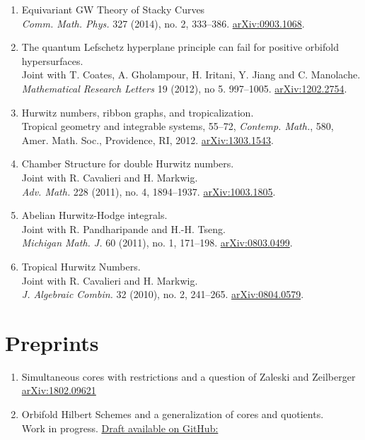 \documentclass[11pt,letterpaper]{article}
\begin{document}
\begin{enumerate}
\item Equivariant GW Theory of Stacky Curves \\  \emph{Comm. Math. Phys.} 327 (2014), no. 2, 333--386. \href{http://arxiv.org/abs/0903.1068}{arXiv:0903.1068}.
\item The quantum Lefschetz hyperplane principle can fail for positive orbifold hypersurfaces. \\
 Joint with T. Coates, A. Gholampour, H. Iritani, Y. Jiang and C. Manolache. \\
   \emph{Mathematical Research Letters} 19 (2012), no 5. 997--1005.
\href{http://arxiv.org/abs/1202.2754}{arXiv:1202.2754}.
\item Hurwitz numbers, ribbon graphs, and tropicalization. \\ Tropical
  geometry and integrable systems, 55--72, \emph{Contemp. Math.}, 580,
  Amer. Math. Soc., Providence, RI, 2012.
\href{http://arxiv.org/abs/1303.1543}{arXiv:1303.1543}.
\item Chamber Structure for double Hurwitz numbers.
\\ Joint with R. Cavalieri and H. Markwig. \\ \emph{Adv. Math.} 228 (2011), no. 4,
  1894--1937.
\href{http://arxiv.org/abs/1003.1805}{arXiv:1003.1805}.
 \item Abelian Hurwitz-Hodge integrals. \\ 
Joint with R. Pandharipande and H.-H. Tseng.  \\  
\emph{Michigan Math. J.} 60 (2011), no. 1, 171--198.
\href{http://arxiv.org/abs/0803.0499}{arXiv:0803.0499}.
\item Tropical Hurwitz Numbers. \\
 Joint with R. Cavalieri and H. Markwig. \\
\emph{J. Algebraic Combin.} 32 (2010), no. 2, 241--265. 
\href{http://arxiv.org/abs/0804.0579}{arXiv:0804.0579}.


\end{enumerate}

\section*{Preprints}
\begin{enumerate}
  
\item Simultaneous cores with restrictions and a question of Zaleski and Zeilberger \\
\href{https://arxiv.org/abs/1802.09621}{arXiv:1802.09621}

\item Orbifold Hilbert Schemes and a generalization of cores and quotients. \\
  Work in progress.  \href{https://github.com/ptwiddle/Orbifold-Hilbert-Schemes-partitions/blob/master/GHilb.pdf}{Draft available on GitHub: }
  \end{enumerate}
\end{document}

